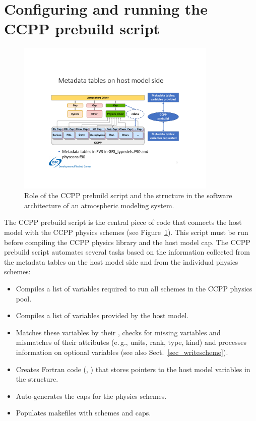 \section{Configuring and running the CCPP prebuild script}
\label{sec_ccpp_prebuild_config}
\begin{figure}
\centerline{\includegraphics[width=0.85\textwidth]{./images/ccpp_design_with_ccpp_prebuild.pdf}}
\caption{Role of the CCPP prebuild script and the  structure in the software architecture of an atmospheric modeling system.}\label{fig_ccpp_design_with_ccpp_prebuild}
\end{figure}
The CCPP prebuild script  is the central piece of code that connects the host model with the CCPP physics schemes (see Figure~\ref{fig_ccpp_design_with_ccpp_prebuild}). This script must be run before compiling the CCPP physics library and the host model cap. The CCPP prebuild script automates several tasks based on the information collected from the metadata tables on the host model side and from the individual physics schemes:
\begin{itemize}
\item Compiles a list of variables required to run all schemes in the CCPP physics pool.
\item Compiles a list of variables provided by the host model.
\item Matches these variables by their , checks for missing variables and mismatches of their attributes (e.\,g., units, rank, type, kind) and processes information on optional variables (see also Sect.~\ref{sec_writescheme}).
\item Creates Fortran code (, ) that stores pointers to the host model variables in the  structure.
\item Auto-generates the caps for the physics schemes.
\item Populates makefiles with schemes and caps.
\end{itemize}

